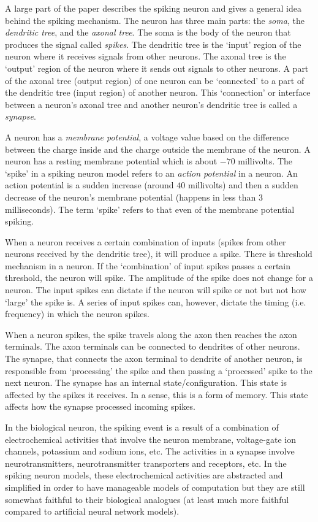 \documentclass[12pt,A4]{article}
\begin{document}
A large part of the paper describes the spiking neuron and gives a general idea behind the spiking 
mechanism. The neuron has three main parts: the \emph{soma}, the \emph{dendritic tree}, and the
\emph{axonal tree}. The soma is the body of the neuron that produces the signal called 
\emph{spikes}. The dendritic tree is the `input' region of the neuron where it receives signals from 
other neurons. The axonal tree is the `output' region of the neuron where it sends out signals to 
other neurons. A part of the axonal tree (output region) of one neuron can be `connected' to a part 
of the dendritic tree (input region) of another neuron. This `connection' or interface between a 
neuron's axonal tree and another neuron's dendritic tree is called a \emph{synapse}.  

A neuron has a \emph{membrane potential}, a voltage value based on the difference between the charge
inside and the charge outside the membrane of the neuron. A neuron has a resting membrane potential 
which is about $-70$ millivolts. The `spike' in a spiking neuron model refers to an \emph{action 
potential} in a neuron. An action potential is a sudden increase (around $40$ millivolts) and then a 
sudden decrease of the neuron's membrane potential (happens in less than $3$ milliseconds). The term 
`spike' refers to that even of the membrane potential spiking. 

When a neuron receives a certain combination of inputs (spikes from other neurons received by the 
dendritic tree), it will produce a spike. There is threshold mechanism in a neuron. If the 
`combination' of input spikes passes a certain threshold, the neuron will spike. The amplitude of 
the spike does not change for a neuron. The input spikes can dictate if the neuron will spike or not 
but not how `large' the spike is. A series of input spikes can, however, dictate the timing (i.e.
frequency) in which the neuron spikes.

When a neuron spikes, the spike travels along the axon then reaches the axon terminals. The axon
terminals can be connected to dendrites of other neurons. The synapse, that connects the axon 
terminal to dendrite of another neuron, is responsible from `processing' the spike and then passing 
a `processed' spike to the next neuron. The synapse has an internal state/configuration. This state
is affected by the spikes it receives. In a sense, this is a form of memory. This state affects how
the synapse processed incoming spikes.   

In the biological neuron, the spiking event is a result of a combination of electrochemical 
activities that involve the neuron membrane, voltage-gate ion channels, potassium and sodium ions, 
etc. The activities in a synapse involve neurotransmitters, neurotransmitter transporters and
receptors, etc. In the spiking neuron models, these electrochemical activities are abstracted and
simplified in order to have manageable models of computation but they are still somewhat faithful to 
their biological analogues (at least much more faithful compared to artificial neural network 
models). 
\end{document}
